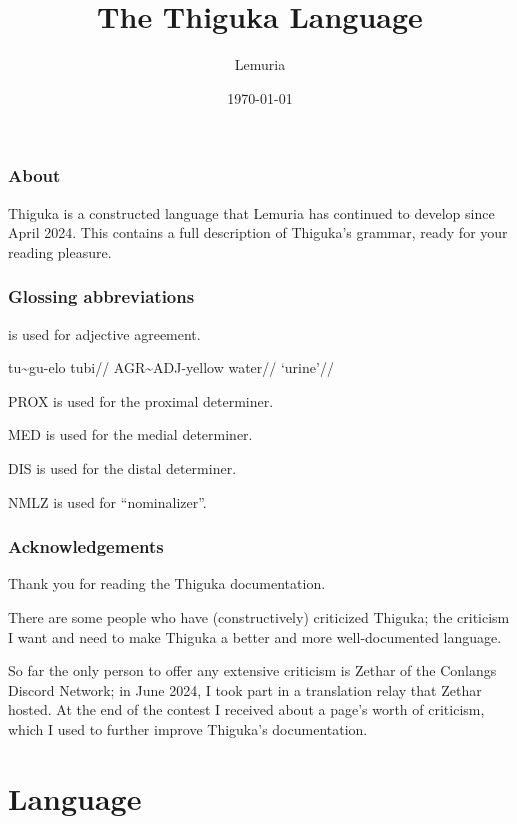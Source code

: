 \documentclass{thigukabook}
\title{The Thiguka Language}
\date{\monthyeardate\today}
\author{Lemuria}
\begin{document}
\maketitle

\newpage

\thigukacopyright{}


\section*{About}
Thiguka is a constructed language that Lemuria has continued to develop since April 2024.
This contains a full description of Thiguka's grammar, ready for your reading pleasure.

\section*{Glossing abbreviations}
\agradj is used for adjective agreement.

\ex
\begingl
    \gla  tu\~{}{}gu-elo tubi//
    \glb  AGR\~{}ADJ-yellow water//
    \glft `urine'//
\endgl
\xe

PROX is used for the proximal determiner.

MED is used for the medial determiner.

DIS is used for the distal determiner.

NMLZ is used for ``nominalizer''.

\section*{Acknowledgements}
Thank you for reading the Thiguka documentation.

There are some people who have (constructively) criticized Thiguka; the criticism I want and need to make Thiguka a better and more well-documented language.

So far the only person to offer any extensive criticism is Zethar of the Conlangs Discord Network; in June 2024, I took part in a translation relay that Zethar hosted.
At the end of the contest I received about a page's worth of criticism, which I used to further improve Thiguka's documentation.

\tableofcontents

\part{Language}







\end{document}
